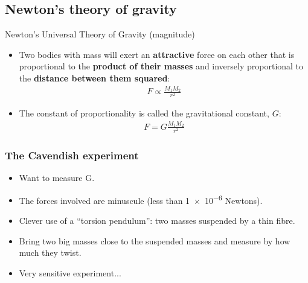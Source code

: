 \documentclass[aspectratio=169,
hyperref={colorlinks,urlcolor=blue}
]{beamer}
\begin{document}
\subsection{Newton's theory of gravity}
\label{subsec:newtonstheoryofgravity}
\begin{frame}{Newton's Universal Theory of Gravity (magnitude)}
\begin{itemize}
\item Two bodies with mass will exert an \textbf{attractive} force on each other that is proportional to the \textbf{product of their masses} and inversely proportional to the \textbf{distance between them squared}:
\begin{align*}
F \propto \frac{M_1M_2}{r^2}
\end{align*}
\item The constant of proportionality is called the gravitational constant, $G$:
\begin{align*}
F =G \frac{M_1M_2}{r^2}
\end{align*}
\end{itemize}
\end{frame}


\subsubsection{The Cavendish experiment}
\label{subsubsec:thecavendishexperiment}
{
\begin{itemize}
\item Want to measure G.
\item The forces involved are minuscule (less than \num{1e-6} Newtons).
\item Clever use of a ``torsion pendulum'': two masses suspended by a thin fibre.
\item Bring two big masses close to the suspended masses and measure by how much they twist.
\item Very sensitive experiment... 
\end{itemize}
}
{
}




\end{document}
